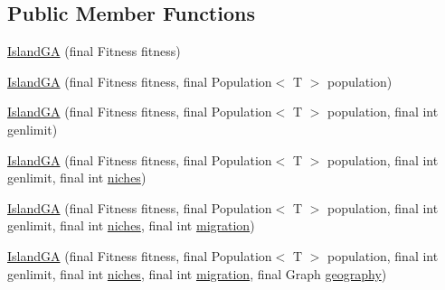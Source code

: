 \subsection*{Public Member Functions}
\begin{DoxyCompactItemize}
\item 
\hyperlink{classjenes_1_1algorithms_1_1_island_g_a_3_01_t_01extends_01_chromosome_01_4_ae36c7bc43e9b6f50a74cd3c2be85d17b}{Island\-G\-A} (final Fitness fitness)
\item 
\hyperlink{classjenes_1_1algorithms_1_1_island_g_a_3_01_t_01extends_01_chromosome_01_4_a7e50ffddeef3cd18e479696e1d7258e4}{Island\-G\-A} (final Fitness fitness, final Population$<$ T $>$ population)
\item 
\hyperlink{classjenes_1_1algorithms_1_1_island_g_a_3_01_t_01extends_01_chromosome_01_4_abaca651c904eb2d4a89380444c3dfd52}{Island\-G\-A} (final Fitness fitness, final Population$<$ T $>$ population, final int genlimit)
\item 
\hyperlink{classjenes_1_1algorithms_1_1_island_g_a_3_01_t_01extends_01_chromosome_01_4_a462cff7f1ffe7db7a13ab925a8f85c50}{Island\-G\-A} (final Fitness fitness, final Population$<$ T $>$ population, final int genlimit, final int \hyperlink{classjenes_1_1algorithms_1_1_island_g_a_3_01_t_01extends_01_chromosome_01_4_a02fc5f134e4e02b3a29afc3bce1ab46f}{niches})
\item 
\hyperlink{classjenes_1_1algorithms_1_1_island_g_a_3_01_t_01extends_01_chromosome_01_4_a183f962ceb12d8cd2885b0ef4a6dd988}{Island\-G\-A} (final Fitness fitness, final Population$<$ T $>$ population, final int genlimit, final int \hyperlink{classjenes_1_1algorithms_1_1_island_g_a_3_01_t_01extends_01_chromosome_01_4_a02fc5f134e4e02b3a29afc3bce1ab46f}{niches}, final int \hyperlink{classjenes_1_1algorithms_1_1_island_g_a_3_01_t_01extends_01_chromosome_01_4_a9bba629926d756819b7725f170b76fd4}{migration})
\item 
\hyperlink{classjenes_1_1algorithms_1_1_island_g_a_3_01_t_01extends_01_chromosome_01_4_a36fa940b12f68377764049c7898fd8bd}{Island\-G\-A} (final Fitness fitness, final Population$<$ T $>$ population, final int genlimit, final int \hyperlink{classjenes_1_1algorithms_1_1_island_g_a_3_01_t_01extends_01_chromosome_01_4_a02fc5f134e4e02b3a29afc3bce1ab46f}{niches}, final int \hyperlink{classjenes_1_1algorithms_1_1_island_g_a_3_01_t_01extends_01_chromosome_01_4_a9bba629926d756819b7725f170b76fd4}{migration}, final Graph \hyperlink{classjenes_1_1algorithms_1_1_island_g_a_3_01_t_01extends_01_chromosome_01_4_aa12c57824b7d6a8e875a75c07d9ad774}{geography})

\end{DoxyCompactItemize}

